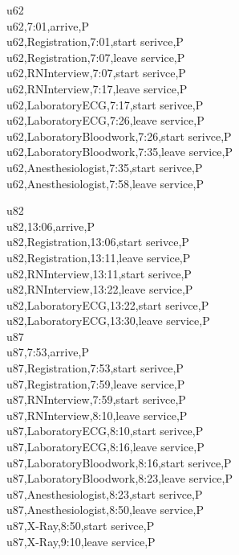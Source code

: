 \documentclass[12pt]{article}
\begin{document}
\quad

u62\\

u62,7:01,arrive,P\\
u62,Registration,7:01,start serivce,P\\
u62,Registration,7:07,leave service,P\\
u62,RNInterview,7:07,start serivce,P\\
u62,RNInterview,7:17,leave service,P\\
u62,LaboratoryECG,7:17,start serivce,P\\
u62,LaboratoryECG,7:26,leave service,P\\
u62,LaboratoryBloodwork,7:26,start serivce,P\\
u62,LaboratoryBloodwork,7:35,leave service,P\\
u62,Anesthesiologist,7:35,start serivce,P\\
u62,Anesthesiologist,7:58,leave service,P\\

\quad

u82\\

u82,13:06,arrive,P\\
u82,Registration,13:06,start serivce,P\\
u82,Registration,13:11,leave service,P\\
u82,RNInterview,13:11,start serivce,P\\
u82,RNInterview,13:22,leave service,P\\
u82,LaboratoryECG,13:22,start serivce,P\\
u82,LaboratoryECG,13:30,leave service,P\\


u87\\

u87,7:53,arrive,P\\
u87,Registration,7:53,start serivce,P\\
u87,Registration,7:59,leave service,P\\
u87,RNInterview,7:59,start serivce,P\\
u87,RNInterview,8:10,leave service,P\\
u87,LaboratoryECG,8:10,start serivce,P\\
u87,LaboratoryECG,8:16,leave service,P\\
u87,LaboratoryBloodwork,8:16,start serivce,P\\
u87,LaboratoryBloodwork,8:23,leave service,P\\
u87,Anesthesiologist,8:23,start serivce,P\\
u87,Anesthesiologist,8:50,leave service,P\\
u87,X-Ray,8:50,start serivce,P\\
u87,X-Ray,9:10,leave service,P\\
\end{document}

